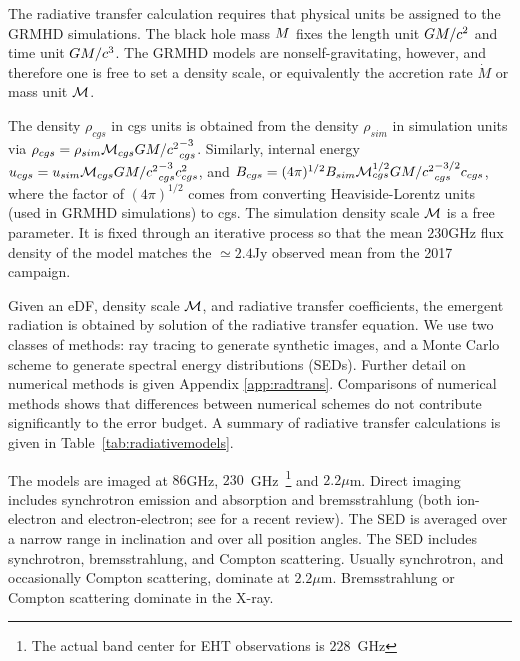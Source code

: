 
The radiative transfer calculation requires that physical units be assigned to the GRMHD simulations.  The black hole mass $M$ fixes the length unit $GM/c^2$ and time unit $GM/c^3$.  The GRMHD models are nonself-gravitating, however, and therefore one is free to set a density scale, or equivalently the accretion rate $\dot{M}$ or mass unit $\mathcal{M}$.

The density $\rho_{cgs}$ in cgs units is obtained from the density $\rho_{sim}$ in simulation units via $\rho_{cgs} = \rho_{sim} \mathcal{M}_{cgs} {GM/c^2}_{cgs}^{-3}$.  Similarly, internal energy $u_{cgs} = u_{sim} \mathcal{M}_{cgs} {GM/c^2}_{cgs}^{-3} c_{cgs}^2$, and $B_{cgs} = (4\pi)^{1/2} B_{sim} \mathcal{M}_{cgs}^{1/2} {GM/c^2}_{cgs}^{-3/2} c_{cgs}$, where the factor of $(4\pi)^{1/2}$ comes from converting Heaviside-Lorentz units (used in GRMHD simulations) to cgs.
The simulation density scale $\mathcal{M}$ is a free parameter.  It is fixed through an iterative process so that the mean $230$GHz flux density of the model matches the $\simeq 2.4$Jy observed mean from the 2017 campaign.


Given an eDF, density scale $\mathcal{M}$, and radiative transfer coefficients, the emergent radiation is obtained by solution of the radiative transfer equation.  We use two classes of methods: ray tracing to generate synthetic images, and a Monte Carlo scheme to generate spectral energy distributions (SEDs).  Further detail on numerical methods is given Appendix \ref{app:radtrans}.  Comparisons of numerical methods \citep[][, Prather et al. 2021]{2020ApJ...897..148G} shows that differences between numerical schemes do not contribute significantly to the error budget.  A summary of  radiative transfer calculations is given in Table~\ref{tab:radiativemodels}.

The models are imaged at $86$GHz, $230$~GHz~\footnote{The actual band center for EHT observations is $228$~GHz} and $2.2\mu$m.  Direct imaging includes synchrotron emission and absorption and bremsstrahlung (both ion-electron and electron-electron; see \citet{2020ApJ...898...50Y} for a recent review).  The SED is averaged over a narrow range in inclination and over all position angles. The SED includes synchrotron, bremsstrahlung, and Compton scattering.  Usually synchrotron, and occasionally Compton scattering, dominate at $2.2\mu$m.  Bremsstrahlung or Compton scattering dominate in the X-ray.

